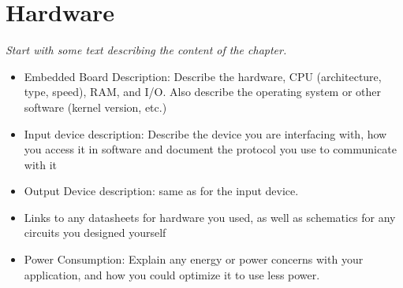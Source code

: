 \section{Hardware}
\emph{Start with some text describing the content of the chapter.}\\


\begin{itemize}
    \item Embedded Board Description: Describe the hardware, CPU (architecture, type, speed), RAM, and I/O.  Also describe the operating system or other software (kernel version, etc.)
    \item Input device description: Describe the device you are interfacing with, how you access it in software and document the protocol you use to communicate with it
    \item Output Device description: same as for the input device.
    \item Links to any datasheets for hardware you used, as well as schematics for any circuits you designed yourself
    \item Power Consumption: Explain any energy or power concerns with your application, and how you could optimize it to use less power.

        
\end{itemize}
